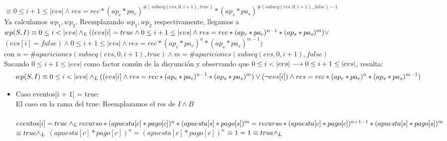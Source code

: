 \documentclass[10pt,a4paper]{article}
\begin{document}
\begin{proof*}
	$\equiv 0\leq i+1 \leq |evs| \wedge res = rec *(ap_c * pa_c)^{\#(subseq(evs, 0, i+1), true)} * (ap_s * pa_s)^{\#(subseq(evs, 0, i+1), false) - 1}$\\
	Ya calculamos $wp_1, wp_2$. Reemplazando $wp_1, wp_2$ respectivamente, llegamos a \\
	$wp(S, I) \equiv 0 \leq i < |evs| \land _L ((evs[i] = true \wedge 0\leq i+1 \leq |evs| \wedge res = rec *(ap_c * pa_c)^{n - 1} * (ap_s * pa_s)^m) \vee $\\
	$(evs[i] = false) \wedge 0\leq i+1 \leq |evs| \wedge res = rec *(ap_c * pa_c)^{n} * (ap_s * pa_s)^{m - 1})$\\
	con $n = \#apariciones(subseq(evs, 0, i+1), true) \wedge m = \#apariciones(subseq(evs, 0, i+1), false)$\\
	Sacando $0 \leq i+1 \leq |evs|$ como factor común de la disyunción y observando que $0 \leq i < |evs| \longrightarrow 0 \leq i + 1 \leq |evs|$, resulta:
	\begin{equation*}
		wp(S, I) \equiv 0 \leq i < |evs|  \land _L ((evs[i] \wedge res = rec *(ap_c * pa_c)^{n - 1} * (ap_s * pa_s)^m) \vee 
		(\neg evs[i]) \wedge res = rec *(ap_c * pa_c)^n * (ap_s * pa_s)^{m - 1})
	\end{equation*}
    \begin{minipage}[t]{19cm}
        \begin{itemize}
            \item{Caso eventos[i + 1] = true: \\
            El caso en la rama del true: Reemplazamos el res de $I \land B$
            \hspace{0.1cm}
            \\  \\  \newline
            \hspace{0.8cm}
            $eventos[i] = true \land _L recurso*(apuesta[c]*pago[c]) ^{n} * (apuesta[s]*pago[s]) ^{m} = recurso * (apuesta[c]*pago[c])^{n + 1 - 1} * (apuesta[s]*pago[s])^{m}$ $\equiv true \land _L$ $(apuesta[c]*pago[c])^{n} = (apuesta[c]*pago[c])^{n}$ $\equiv 1 = 1 \equiv true \land _L$ }
        \end{itemize}
    \end{minipage}
    

\end{proof*}
\end{document}
